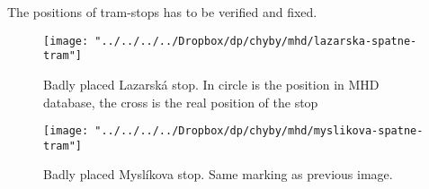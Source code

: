 \documentclass[11pt,oneside,a4paper]{book}
\begin{document}
			The positions of tram-stops has to be verified and fixed.
			\begin{figure}[!htb]
				\texttt{[image: "../../../../Dropbox/dp/chyby/mhd/lazarska-spatne-tram"]}
				\caption{Badly placed Lazarská stop. In circle is the position in MHD database, the cross is the real position of the stop}\label{fig:awesome_image1}
				\endminipage\hfill
				\texttt{[image: "../../../../Dropbox/dp/chyby/mhd/myslikova-spatne-tram"]}
				\caption{Badly placed Myslíkova stop. Same marking as previous image.}\label{fig:myslikova-spatne-tram}
				\endminipage\hfill
			\end{figure}
		
		
	
	

	
	
	
	
		
	{
		\def\CS{$\cal C\kern-0.1667em\lower.5ex\hbox{$\cal S$}\kern-0.075em $}
		
	}
	
	
	
\end{document}
